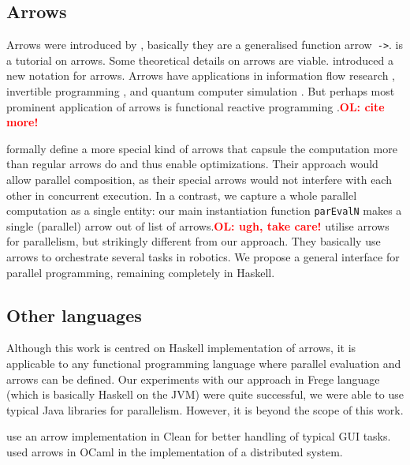 \documentclass{jfp1}
\renewcommand{\cite}[1]{\citep{#1}}
\newcommand{\inlinecode}[1]{\texttt{#1}}
\newcommand{\comm}[2]{\textcolor{red}{\bfseries #1: #2}}
\newcommand{\olcomment}[1]{\comm{OL}{#1}}
\begin{document}
\subsection{Arrows}

Arrows were introduced by \citet{HughesArrows}, basically they are a generalised function arrow~\inlinecode{->}. \citet{Hughes2005} is a tutorial on arrows. Some theoretical details on arrows \cite{jacobs_heunen_hasuo_2009,LINDLEY201197,ATKEY201119} are viable. \citet{Paterson:2001:NNA:507669.507664} introduced a new notation for arrows. Arrows have applications in information flow research \cite{1648705,LI20101974,Russo:2008:LLI:1411286.1411289}, invertible programming \cite{Alimarine:2005:BAA:1088348.1088357}, and quantum computer simulation \cite{vizzotto_altenkirch_sabry_2006}. But perhaps most prominent application of arrows is functional reactive programming \cite{Hudak2003}.\olcomment{cite more!}

\citet{Liu:2009:CCA:1631687.1596559} formally define a more special kind of arrows that capsule the computation more than regular arrows do and thus enable optimizations. Their approach would allow parallel composition, as their special arrows would not interfere with each other in concurrent execution. In a contrast, we capture a whole parallel computation as a single entity: our main instantiation function \inlinecode{parEvalN} makes a single (parallel) arrow out of list of arrows.\olcomment{ugh, take care!}
\citet{Huang2007} utilise arrows for parallelism, but strikingly different from our approach. They basically use arrows to orchestrate several tasks in robotics. We propose a general interface for parallel programming, remaining completely in Haskell.

\subsection{Other languages}

Although this work is centred on Haskell implementation of arrows, it is applicable to any functional programming language where parallel evaluation and arrows can be defined. Our experiments with our approach in Frege language (which is basically Haskell on the JVM) were quite successful, we were able to use typical Java libraries for parallelism. However, it is beyond the scope of this work.

\citet{achten2004arrows,achten2007arrow} use an arrow implementation in Clean for better handling of typical GUI tasks. \citet{Dagand:2009:ORD:1481861.1481870} used arrows in OCaml in the implementation of a distributed system.
\end{document}
